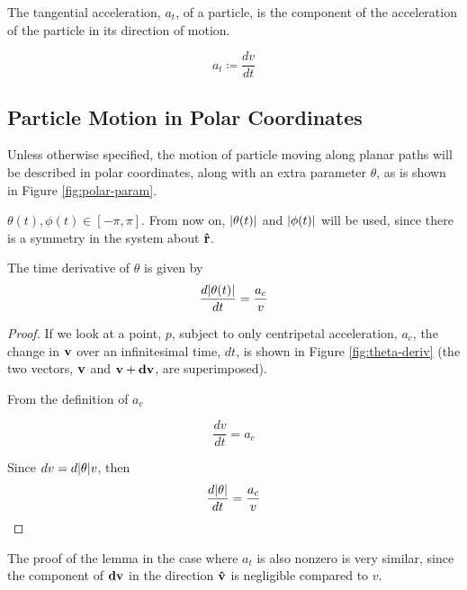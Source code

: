 \begin{definition}
  The tangential acceleration, $a_t$, of a particle, is the component of the acceleration of the particle in its direction of motion.

  \[a_t \coloneqq \frac{dv}{dt}\]
\end{definition}


\subsection{Particle Motion in Polar Coordinates}

Unless otherwise specified, the motion of particle moving along planar paths  will be described in polar coordinates, along with an extra parameter $\theta$, as is shown in Figure \ref{fig:polar-param}.


$\theta(t), \phi(t) \in [-\pi, \pi]$. From now on, $\abs{\theta(t)}$ and $\abs{\phi(t)}$ will be used, since there is a symmetry in the system about $\mathbf{\hat{r}}$.

\begin{lemma}
The time derivative of $\theta$ is given by
\[
\frac{d\abs{\theta(t)}}{dt} = \frac{a_c}{v}
\]
\end{lemma}

\begin{proof}

If we look at a point, $p$, subject to only centripetal acceleration, $a_c$, the change in $\mathbf{v}$ over an infinitesimal time, $dt$, is shown in Figure \ref{fig:theta-deriv} (the two vectors, $\mathbf{v}$ and $\mathbf{v}+\mathbf{dv}$, are superimposed). 


From the definition of $a_c$

\[
\frac{dv}{dt} = a_c
\]

Since $dv = d\abs{\theta} v$, then
\[
\frac{d\abs{\theta}}{dt} = \frac{a_c}{v}
\]
\end{proof}

The proof of the lemma in the case where $a_t$ is also nonzero is very similar, since the component of $\mathbf{dv}$ in the direction $\mathbf{\hat{v}}$ is negligible compared to $v$.

